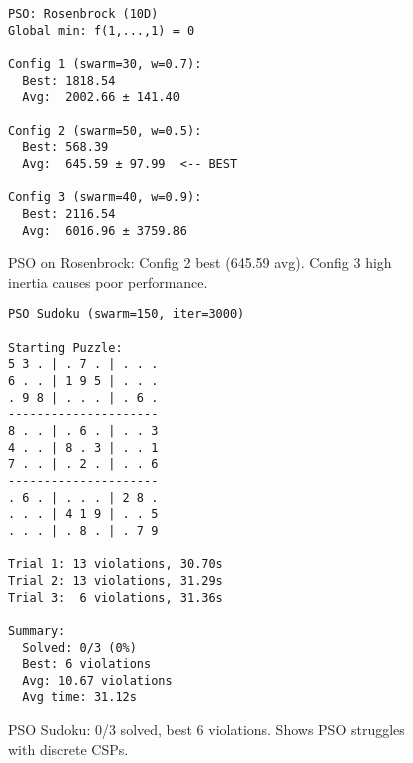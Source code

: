 \documentclass[letterpaper]{article}
\begin{document}
\begin{figure}[h]
\begin{scriptsize}
\begin{verbatim}
PSO: Rosenbrock (10D)
Global min: f(1,...,1) = 0

Config 1 (swarm=30, w=0.7):
  Best: 1818.54
  Avg:  2002.66 ± 141.40

Config 2 (swarm=50, w=0.5):
  Best: 568.39
  Avg:  645.59 ± 97.99  <-- BEST

Config 3 (swarm=40, w=0.9):
  Best: 2116.54
  Avg:  6016.96 ± 3759.86
\end{verbatim}
\end{scriptsize}
\caption{PSO on Rosenbrock: Config 2 best (645.59 avg). Config 3 high inertia causes poor performance.}
\label{fig:pso-rosenbrock}
\end{figure}

\begin{figure}[h]
\begin{scriptsize}
\begin{verbatim}
PSO Sudoku (swarm=150, iter=3000)

Starting Puzzle:
5 3 . | . 7 . | . . .
6 . . | 1 9 5 | . . .
. 9 8 | . . . | . 6 .
---------------------
8 . . | . 6 . | . . 3
4 . . | 8 . 3 | . . 1
7 . . | . 2 . | . . 6
---------------------
. 6 . | . . . | 2 8 .
. . . | 4 1 9 | . . 5
. . . | . 8 . | . 7 9

Trial 1: 13 violations, 30.70s
Trial 2: 13 violations, 31.29s
Trial 3:  6 violations, 31.36s

Summary:
  Solved: 0/3 (0%)
  Best: 6 violations
  Avg: 10.67 violations
  Avg time: 31.12s
\end{verbatim}
\end{scriptsize}
\caption{PSO Sudoku: 0/3 solved, best 6 violations. Shows PSO struggles with discrete CSPs.}
\label{fig:pso-sudoku}
\end{figure}

\clearpage



\end{document}
